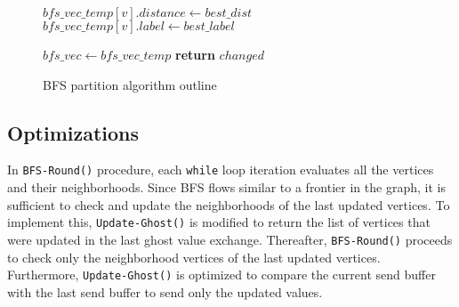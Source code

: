 \documentclass[conference]{IEEEtran}
\begin{document}
\begin{figure}
\begin{algorithmic}[1]
            \EndIf
            \EndFor
        \State $bfs\_vec\_temp[v].distance \gets best\_dist$
        \State $bfs\_vec\_temp[v].label \gets best\_label$

        \EndFor
        \State $bfs\_vec \gets bfs\_vec\_temp$
    \EndWhile
    \State \textbf{return} $changed$
    \EndProcedure


    \end{algorithmic}  
    \caption{BFS partition algorithm outline}  
    \label{algo:bfs-par-outline}  
\end{figure}

\subsection{Optimizations}
In \verb|BFS-Round()| procedure, each \verb|while| loop iteration evaluates all the vertices and their neighborhoods. Since BFS flows similar to a frontier in the graph, it is sufficient to check and update the neighborhoods of the last updated vertices. To implement this, \verb|Update-Ghost()| is modified to return the list of vertices that were updated in the last ghost value exchange. Thereafter, \verb|BFS-Round()| proceeds to check only the neighborhood vertices of the last updated vertices. Furthermore, \verb|Update-Ghost()| is optimized to compare the current send buffer with the last send buffer to send only the updated values.




\end{document}
